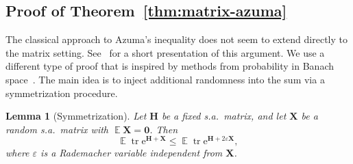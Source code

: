\documentclass[11pt,letterpaper,twoside,reqno,draft]{amsart}
\newtheorem{lemma}[thm]{Lemma}
\theoremstyle{remark}
\numberwithin{equation}{section}
\numberwithin{thm}{section}
\begin{document}
\subsection{Proof of Theorem~\ref{thm:matrix-azuma}}

The classical approach to Azuma's inequality does not seem to extend directly to the matrix setting.  See~\cite[Lem.~2.6]{McD98:Concentration} for a short presentation of this argument.  We use a different type of proof that is inspired by methods from probability in Banach space~\cite{LT91:Probability-Banach}.  The main idea is to inject additional randomness into the sum via a symmetrization procedure.

\begin{lemma}[Symmetrization] \label{lem:symmetrization}
Let ${\bm{{H}}}$ be a fixed s.a.~matrix, and let ${\bm{{X}}}$ be a random s.a.~matrix with ${\operatorname{\mathbb{E}}} {\bm{{X}}} = {\bm{{0}}}$.  Then
$$
{\operatorname{\mathbb{E}}} {\operatorname{tr}} {\mathrm{e}}^{{\bm{{H}}} + {\bm{{X}}}}
	\leq {\operatorname{\mathbb{E}}} {\operatorname{tr}} {\mathrm{e}}^{{\bm{{H}}} + 2{\varepsilon}{\bm{{X}}}},
$$
where ${\varepsilon}$ is a Rademacher variable independent from ${\bm{{X}}}$.
\end{lemma}
\end{document}
